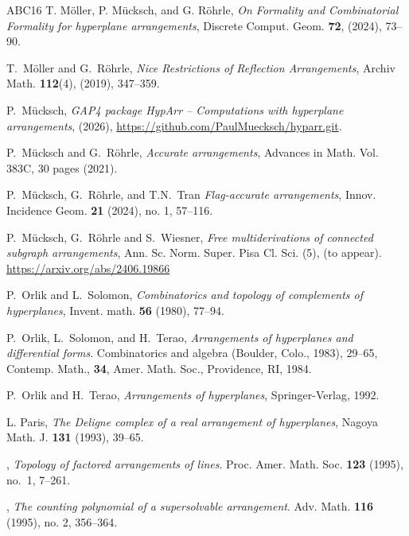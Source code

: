 \documentclass[12pt]{amsart}
\numberwithin{equation}{section}
\theoremstyle{plain}
\theoremstyle{definition}
\begin{document}
\begin{thebibliography}{ABC{\etalchar{+}}16}
T. M\"oller, P. M\"ucksch, and G. R\"ohrle,
 \emph{On Formality and Combinatorial Formality for hyperplane arrangements},
 Discrete Comput. Geom. \textbf{72}, (2024), 73--90.
 
 T.~M\"oller and G.~R\"ohrle, 
 \emph{Nice Restrictions of Reflection Arrangements},
 Archiv Math. \textbf{112}(4), (2019), 347--359.
 
 
  P.~M\"ucksch,
 \emph{GAP4 package HypArr -- Computations with hyperplane arrangements}, (2026), 
 	\url{https://github.com/PaulMuecksch/hyparr.git}.
 
 	 P.~M\"ucksch and G.~R\"ohrle,
 \emph{Accurate arrangements}, Advances in Math.
 Vol. 383C, 30 pages (2021).

 	 P.~M\"ucksch, G.~R\"ohrle, and T.N.~Tran
 \emph{Flag-accurate arrangements}, 
 Innov. Incidence Geom. \textbf{21} (2024), no. 1, 57--116.

 	 P.~M\"ucksch, G.~R\"ohrle and S.~Wiesner,
 \emph{Free multiderivations of connected subgraph arrangements}, Ann. Sc. Norm. Super. Pisa Cl. Sci. (5), (to appear). \url{https://arxiv.org/abs/2406.19866}

 P.~Orlik and L.~Solomon,
 \emph{Combinatorics and topology of complements of hyperplanes},
 Invent. math. \textbf{56} (1980), 77--94.

 P.~Orlik, L.~Solomon, and H.~Terao,
 \emph{Arrangements of hyperplanes and differential forms}.
 Combinatorics and algebra (Boulder, Colo., 1983), 29--65,
 Contemp. Math., \textbf{34}, Amer. Math. Soc., Providence, RI, 1984.

 P.~Orlik and H.~Terao,
  \emph{Arrangements of hyperplanes}, Springer-Verlag, 1992.

L. Paris,
\emph{The Deligne complex of a real arrangement of hyperplanes},
Nagoya Math. J. \textbf{131} (1993), 39--65.

\bysame, %
\emph{Topology of factored arrangements of lines}.
Proc. Amer. Math. Soc. \textbf{123} (1995), no.~1, 7--261.

\bysame, %
\emph{The counting polynomial of a supersolvable arrangement}. 
Adv. Math. \textbf{116} (1995), no. 2, 356--364. 



\end{thebibliography}
\end{document}
